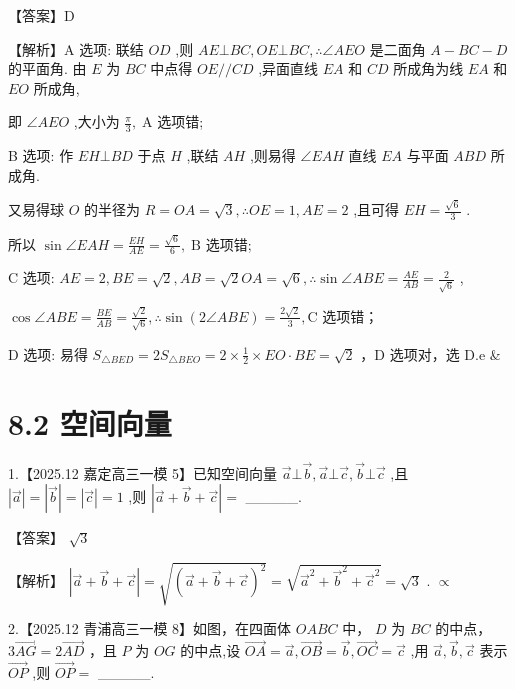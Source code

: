 \documentclass[10pt]{article}
\begin{document}
【答案】D

【解析】A 选项: 联结 \({OD}\) ,则 \({AE} \bot  {BC},{OE} \bot  {BC},\therefore \angle {AEO}\) 是二面角 \(A - {BC} - D\) 的平面角. 由 \(E\) 为 \({BC}\) 中点得 \({OE}//{CD}\) ,异面直线 \({EA}\) 和 \({CD}\) 所成角为线 \({EA}\) 和 \({EO}\) 所成角,

即 \(\angle {AEO}\) ,大小为 \(\frac{\pi }{3},\mathrm{\;A}\) 选项错;

B 选项: 作 \({EH} \bot  {BD}\) 于点 \(H\) ,联结 \({AH}\) ,则易得 \(\angle {EAH}\) 直线 \({EA}\) 与平面 \({ABD}\) 所成角.

又易得球 \(O\) 的半径为 \(R = {OA} = \sqrt{3},\therefore {OE} = 1,{AE} = 2\) ,且可得 \({EH} = \frac{\sqrt{6}}{3}\) .

所以 \(\sin \angle {EAH} = \frac{EH}{AE} = \frac{\sqrt{6}}{6},\mathrm{\;B}\) 选项错;

C 选项: \({AE} = 2,{BE} = \sqrt{2},{AB} = \sqrt{2}{OA} = \sqrt{6},\therefore \sin \angle {ABE} = \frac{AE}{AB} = \frac{2}{\sqrt{6}}\) ,

\(\cos \angle {ABE} = \frac{BE}{AB} = \frac{\sqrt{2}}{\sqrt{6}},\therefore \sin \left( {2\angle {ABE}}\right)  = \frac{2\sqrt{2}}{3},\mathrm{C}\) 选项错；

D 选项: 易得 \({S}_{\bigtriangleup {BED}} = 2{S}_{\bigtriangleup {BEO}} = 2 \times  \frac{1}{2} \times  {EO} \cdot  {BE} = \sqrt{2}\) ，D 选项对，选 D.e \&

\section*{8.2 空间向量}

1.【2025.12 嘉定高三一模 5】已知空间向量 \(\overrightarrow{a}\bot \overrightarrow{b},\overrightarrow{a}\bot \overrightarrow{c},\overrightarrow{b}\bot \overrightarrow{c}\) ,且 \(\left| \overrightarrow{a}\right|  = \left| \overrightarrow{b}\right|  = \left| \overrightarrow{c}\right|  = 1\) ,则 \(\left| {\overrightarrow{a} + \overrightarrow{b} + \overrightarrow{c}}\right|  =\) \_\_\_\_\_.

【答案】 \(\sqrt{3}\)

【解析】 \(\left| {\overrightarrow{a} + \overrightarrow{b} + \overrightarrow{c}}\right|  = \sqrt{{\left( \overrightarrow{a} + \overrightarrow{b} + \overrightarrow{c}\right) }^{2}} = \sqrt{{\overrightarrow{a}}^{2} + {\overrightarrow{b}}^{2} + {\overrightarrow{c}}^{2}} = \sqrt{3}\) . \(\propto\)

2.【2025.12 青浦高三一模 8】如图，在四面体 \({OABC}\) 中， \(D\) 为 \({BC}\) 的中点， \(3\overrightarrow{AG} = 2\overrightarrow{AD}\) ，且 \(P\) 为 \({OG}\) 的中点,设 \(\overrightarrow{OA} = \overrightarrow{a},\overrightarrow{OB} = \overrightarrow{b},\overrightarrow{OC} = \overrightarrow{c}\) ,用 \(\overrightarrow{a},\overrightarrow{b},\overrightarrow{c}\) 表示 \(\overrightarrow{OP}\) ,则 \(\overrightarrow{OP} =\) \_\_\_\_\_.
\end{document}
